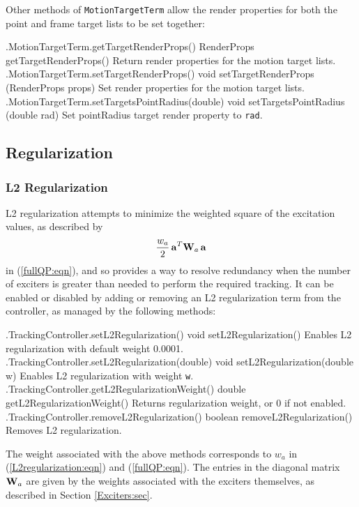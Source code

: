 Other methods of {\tt MotionTargetTerm} allow the render properties for both
the point and frame target lists to be set together:
%
\begin{methodtable}{0.55}{0.45}
\midline
%
\methodentry
{\inverse.MotionTargetTerm.getTargetRenderProps()}%
{RenderProps getTargetRenderProps()}%
{Return render properties for the motion target lists.}%
%
\methodentry
{\inverse.MotionTargetTerm.setTargetRenderProps()}%
{void setTargetRenderProps (RenderProps props)}%
{Set render properties for the motion target lists.}%
%
\methodentry
{\inverse.MotionTargetTerm.setTargetsPointRadius(double)}%
{void setTargetsPointRadius (double rad)}%
{Set {\sf pointRadius} target render property to {\tt rad}.}%
%
\midline
\end{methodtable}
%

\subsection{Regularization}
\label{Regularization:sec}

\subsubsection{L2 Regularization}
\label{L2Regularization:sec}

L2 regularization attempts to minimize the weighted square of the excitation
values, as described by
%
\begin{equation}
\frac{w_a}{2} \, {\bf a}^T {\bf W}_a \, {\bf a}
\label{L2regularization:eqn}
\end{equation}
%
in (\ref{fullQP:eqn}), and so provides a way to resolve redundancy when the
number of exciters is greater than needed to perform the required tracking. It
can be enabled or disabled by adding or removing an L2 regularization term from
the controller, as managed by the following methods:
%
\begin{methodtable}{0.58}{0.42}
\midline
%
\methodentry
{\inverse.TrackingController.setL2Regularization()}%
{void setL2Regularization()}%
{Enables L2 regularization with default weight 0.0001.}%
%
\methodentry
{\inverse.TrackingController.setL2Regularization(double)}%
{void setL2Regularization(double w)}%
{Enables L2 regularization with weight {\tt w}.}%
%
\methodentry
{\inverse.TrackingController.getL2RegularizationWeight()}%
{double getL2RegularizationWeight()}%
{Returns regularization weight, or 0 if not enabled.}%
%
\methodentry
{\inverse.TrackingController.removeL2Regularization()}%
{boolean removeL2Regularization()}%
{Removes L2 regularization.}%
%
\midline
\end{methodtable}
%
The weight associated with the above methods corresponds to $w_a$ in
(\ref{L2regularization:eqn}) and (\ref{fullQP:eqn}). The entries in the
diagonal matrix ${\bf W}_a$ are given by the weights associated with the exciters
themselves, as described in Section \ref{Exciters:sec}.

